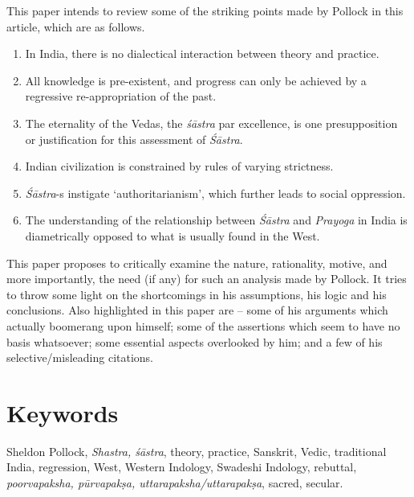 This paper intends to review some of the striking points made by Pollock in this article, which are as follows.
\begin{enumerate}
\item In India, there is no dialectical interaction between theory and practice.

\item All knowledge is pre-existent, and progress can only be achieved by a regressive re-appropriation of the past.

\item The eternality of the Vedas, the {\it śāstra} par excellence, is one presupposition or justification for this assessment of {\it Śāstra}.

\item Indian civilization is constrained by rules of varying strictness.

\item {\it Śāstra}-s instigate `authoritarianism', which further leads to social oppression.

\item The understanding of the relationship between {\it Śāstra} and {\it Prayoga} in India is  diametrically opposed to what is usually found in the West. 
\end{enumerate}

This paper proposes to critically examine the nature, rationality, motive, and more importantly, the need (if any) for such an analysis made by Pollock. It tries to throw some light on the shortcomings in his assumptions, his logic and his conclusions. Also highlighted in this paper are -- some of his arguments which actually boomerang upon himself; some of the assertions which seem to have no basis whatsoever; some essential aspects overlooked by him; and a few of his selective/misleading citations.

\vskip -12pt

\section*{Keywords}

Sheldon Pollock, \textsl{Shastra, śāstra}, theory, practice, Sanskrit, Vedic, traditional India, regression, West, Western Indology, Swadeshi Indology, rebuttal, \textsl{poorvapaksha, pūrvapakṣa, uttarapaksha/uttarapakṣa}, sacred, secular.


